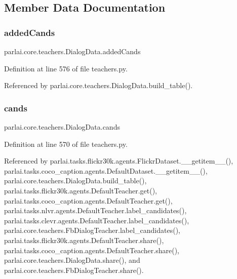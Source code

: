 \subsection{Member Data Documentation}
\mbox{\label{classparlai_1_1core_1_1teachers_1_1DialogData_aee61e6bc9e80fe0443a7f5322c4ae08d}} 
\subsubsection{\texorpdfstring{added\+Cands}{addedCands}}
{\footnotesize\ttfamily parlai.\+core.\+teachers.\+Dialog\+Data.\+added\+Cands}



Definition at line 576 of file teachers.\+py.



Referenced by parlai.\+core.\+teachers.\+Dialog\+Data.\+build\+\_\+table().

\mbox{\label{classparlai_1_1core_1_1teachers_1_1DialogData_a21822d2d86e26a27bdc8326b48ebc9b9}} 
\subsubsection{\texorpdfstring{cands}{cands}}
{\footnotesize\ttfamily parlai.\+core.\+teachers.\+Dialog\+Data.\+cands}



Definition at line 570 of file teachers.\+py.



Referenced by parlai.\+tasks.\+flickr30k.\+agents.\+Flickr\+Dataset.\+\_\+\+\_\+getitem\+\_\+\+\_\+(), parlai.\+tasks.\+coco\+\_\+caption.\+agents.\+Default\+Dataset.\+\_\+\+\_\+getitem\+\_\+\+\_\+(), parlai.\+core.\+teachers.\+Dialog\+Data.\+build\+\_\+table(), parlai.\+tasks.\+flickr30k.\+agents.\+Default\+Teacher.\+get(), parlai.\+tasks.\+coco\+\_\+caption.\+agents.\+Default\+Teacher.\+get(), parlai.\+tasks.\+nlvr.\+agents.\+Default\+Teacher.\+label\+\_\+candidates(), parlai.\+tasks.\+clevr.\+agents.\+Default\+Teacher.\+label\+\_\+candidates(), parlai.\+core.\+teachers.\+Fb\+Dialog\+Teacher.\+label\+\_\+candidates(), parlai.\+tasks.\+flickr30k.\+agents.\+Default\+Teacher.\+share(), parlai.\+tasks.\+coco\+\_\+caption.\+agents.\+Default\+Teacher.\+share(), parlai.\+core.\+teachers.\+Dialog\+Data.\+share(), and parlai.\+core.\+teachers.\+Fb\+Dialog\+Teacher.\+share().

